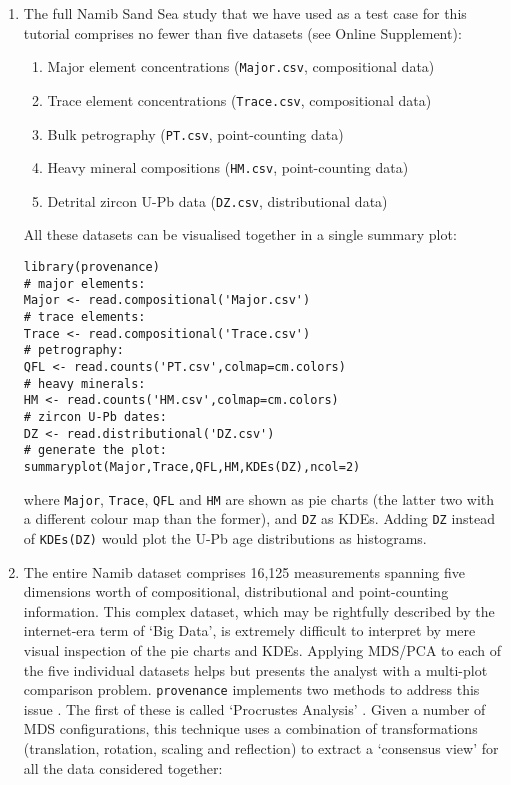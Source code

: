 \documentclass[11pt]{article}
\begin{document}
\begin{enumerate}

\item The full Namib Sand Sea study that we have used as a test case
  for this tutorial comprises no fewer than five datasets (see Online
  Supplement):

  \begin{enumerate}
  \item Major element concentrations (\texttt{Major.csv}, compositional data)
  \item Trace element concentrations (\texttt{Trace.csv}, compositional data)
  \item Bulk petrography (\texttt{PT.csv}, point-counting data)
  \item Heavy mineral compositions (\texttt{HM.csv}, point-counting data)
  \item Detrital zircon U-Pb data (\texttt{DZ.csv}, distributional data)
  \end{enumerate}

  All these datasets can be visualised together in a single summary
  plot:

\begin{verbatim}
library(provenance)
# major elements:
Major <- read.compositional('Major.csv')
# trace elements:
Trace <- read.compositional('Trace.csv')
# petrography:
QFL <- read.counts('PT.csv',colmap=cm.colors)
# heavy minerals:
HM <- read.counts('HM.csv',colmap=cm.colors)
# zircon U-Pb dates:
DZ <- read.distributional('DZ.csv')
# generate the plot:
summaryplot(Major,Trace,QFL,HM,KDEs(DZ),ncol=2)
\end{verbatim}

  where \texttt{Major}, \texttt{Trace}, \texttt{QFL} and \texttt{HM}
  are shown as pie charts (the latter two with a different colour map
  than the former), and \texttt{DZ} as KDEs. Adding \texttt{DZ}
  instead of \texttt{KDEs(DZ)} would plot the U-Pb age distributions
  as histograms.

\item The entire Namib dataset comprises 16,125 measurements spanning
  five dimensions worth of compositional, distributional and
  point-counting information.  This complex dataset, which may be
  rightfully described by the internet-era term of `Big Data', is
  extremely difficult to interpret by mere visual inspection of the
  pie charts and KDEs.  Applying MDS/PCA to each of the five
  individual datasets helps but presents the analyst with a multi-plot
  comparison problem. \texttt{provenance} implements two methods to
  address this issue \citep{vermeesch2015}. The first of these is
  called `Procrustes Analysis' \citep{gower1975}. Given a number of
  MDS configurations, this technique uses a combination of
  transformations (translation, rotation, scaling and reflection) to
  extract a `consensus view' for all the data considered together:


\end{enumerate}
\end{document}

